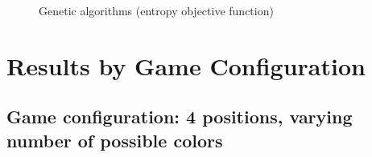 \documentclass[11pt]{article}
\begin{document}
\begin{figure}[h!]
\centering
{}
\caption{Genetic algorithms (entropy objective function)}
\label{fig:gaentropy2}
\end{figure}

\newpage
\section{Results by Game Configuration}\label{tabular_results}

\subsection*{Game configuration: 4 positions, varying number of possible colors}
\end{document}
